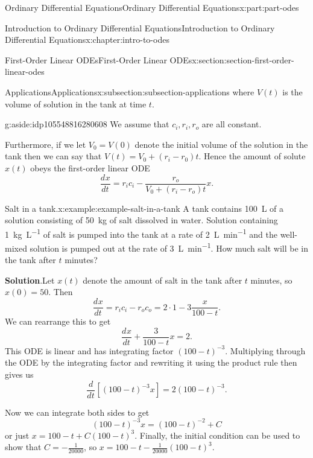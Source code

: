 \documentclass[twoside,10pt,]{book}
\newcommand{\blocktitlefont}{\relax}
\numberwithin{equation}{part}
\providecommand{\dv}[3][]{\dfrac{d^{#1} #2}{d #3^{#1}}}
\begin{document}
\begin{partptx}{Ordinary Differential Equations}{}{Ordinary Differential Equations}{}{}{x:part:part-odes}
\begin{chapterptx}{Introduction to Ordinary Differential Equations}{}{Introduction to Ordinary Differential Equations}{}{}{x:chapter:intro-to-odes}
\begin{sectionptx}{First-Order Linear ODEs}{}{First-Order Linear ODEs}{}{}{x:section:section-first-order-linear-odes}
\begin{subsectionptx}{Applications}{}{Applications}{}{}{x:subsection:subsection-applications}
where \(V(t)\) is the volume of solution in the tank at time \(t\). \begin{aside}{}{g:aside:idp105548816280608}%
We assume that \(c_{i},r_{i},r_{o}\) are all constant.%
\end{aside}
 Furthermore, if we let \(V_{0} = V(0)\) denote the initial volume of the solution in the tank then we can say that \(V(t) = V_{0} + (r_{i}-r_{0})t.\) Hence the amount of solute \(x(t)\) obeys the first-order linear ODE%
\begin{equation*}
\dv{x}{t} = r_{i}c_{i} - \frac{r_{o}}{V_{0}+(r_{i}-r_{o})t}x.
\end{equation*}
%
\begin{example}{Salt in a tank.}{x:example:example-salt-in-a-tank}%
A tank contains \SI{100}{\liter} of a solution consisting of \SI{50}{\kilo\gram} of salt dissolved in water. Solution containing \SI{1}{\kilo\gram\per\liter} of salt is pumped into the tank at a rate of \SI{2}{\liter\per\minute} and the well-mixed solution is pumped out at the rate of \SI{3}{\liter\per\minute}. How much salt will be in the tank after \(t\) minutes?%
\par\smallskip%
\noindent\textbf{\blocktitlefont Solution}.\hypertarget{g:solution:idp105548816289184}{}\quad{}Let \(x(t)\) denote the amount of salt in the tank after \(t\) minutes, so \(x(0) = 50\). Then%
\begin{equation*}
\dv{x}{t} = r_{i}c_{i}-r_{o}c_{o} = 2\cdot1-3\frac{x}{100-t}.
\end{equation*}
We can rearrange this to get%
\begin{equation*}
\dv{x}{t} + \frac{3}{100-t}x = 2.
\end{equation*}
This ODE is linear and has integrating factor \((100-t)^{-3}\). Multiplying through the ODE by the integrating factor and rewriting it using the product rule then gives us%
\begin{equation*}
\dv{}{t}[(100-t)^{-3}x] = 2(100-t)^{-3}.
\end{equation*}
%
\par
Now we can integrate both sides to get%
\begin{equation*}
(100-t)^{-3}x = (100-t)^{-2}+C
\end{equation*}
or just \(x = 100-t+C(100-t)^{3}\). Finally, the initial condition can be used to show that \(C = -\frac{1}{20000}\), so \(x = 100-t - \frac{1}{20000}(100-t)^{3}\).%
\end{example}
\end{subsectionptx}
\begin{conclusion}{}%

\end{conclusion}
\end{sectionptx}
\end{chapterptx}
\end{partptx}
\end{document}
